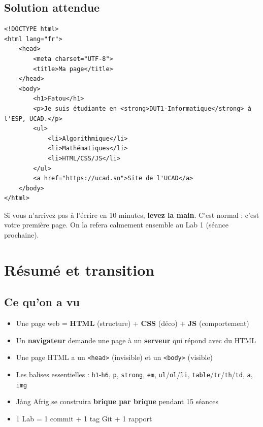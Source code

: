 \documentclass[11pt,a4paper]{article}
\begin{document}
\subsection{Solution attendue}

\begin{lstlisting}[language=HTML5]
<!DOCTYPE html>
<html lang="fr">
    <head>
        <meta charset="UTF-8">
        <title>Ma page</title>
    </head>
    <body>
        <h1>Fatou</h1>
        <p>Je suis étudiante en <strong>DUT1-Informatique</strong> à l'ESP, UCAD.</p>
        <ul>
            <li>Algorithmique</li>
            <li>Mathématiques</li>
            <li>HTML/CSS/JS</li>
        </ul>
        <a href="https://ucad.sn">Site de l'UCAD</a>
    </body>
</html>
\end{lstlisting}

\begin{infobox}
Si vous n'arrivez pas à l'écrire en 10 minutes, \textbf{levez la main}.
C'est normal : c'est votre première page. On la refera calmement ensemble
au Lab 1 (séance prochaine).
\end{infobox}

\section{Résumé et transition}

\subsection{Ce qu'on a vu}

\begin{itemize}[leftmargin=*,nosep]
    \item Une page web = \textbf{HTML} (structure) + \textbf{CSS} (déco) + \textbf{JS} (comportement)
    \item Un \textbf{navigateur} demande une page à un \textbf{serveur} qui répond avec du HTML
    \item Une page HTML a un \texttt{<head>} (invisible) et un \texttt{<body>} (visible)
    \item Les balises essentielles : \texttt{h1}-\texttt{h6}, \texttt{p}, \texttt{strong}, \texttt{em}, \texttt{ul}/\texttt{ol}/\texttt{li}, \texttt{table}/\texttt{tr}/\texttt{th}/\texttt{td}, \texttt{a}, \texttt{img}
    \item Jàng Afrig se construira \textbf{brique par brique} pendant 15 séances
    \item 1 Lab = 1 commit + 1 tag Git + 1 rapport
\end{itemize}
\end{document}
